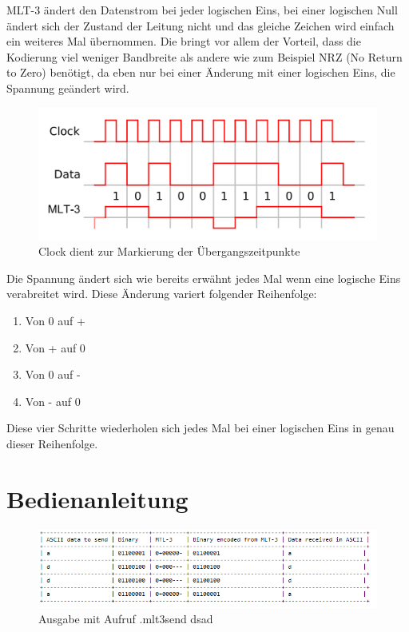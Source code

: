 \documentclass{article}
\begin{document}
MLT-3 ändert den Datenstrom bei jeder logischen Eins, bei einer logischen Null ändert sich der Zustand der Leitung nicht und das
gleiche Zeichen wird einfach ein weiteres Mal übernommen. Die bringt vor allem der Vorteil, dass die Kodierung viel weniger Bandbreite als
andere wie zum Beispiel NRZ (No Return to Zero) benötigt, da eben nur bei einer Änderung mit einer logischen Eins, die Spannung geändert wird.

\begin{center}
\begin{figure}[h]
    \centering
    \includegraphics[width=\textwidth]{MLT3encoding.png}
    \caption{Clock dient zur Markierung der Übergangszeitpunkte}
\end{figure}
\end{center}
\break

Die Spannung ändert sich wie bereits erwähnt jedes Mal wenn eine logische Eins verabreitet wird. Diese Änderung variert folgender
Reihenfolge:

\begin{enumerate}
	\item Von 0 auf +
	\item Von + auf 0
	\item Von 0 auf -
	\item Von - auf 0
\end{enumerate}

Diese vier Schritte wiederholen sich jedes Mal bei einer logischen Eins in genau dieser Reihenfolge.

\section{Bedienanleitung}

\begin{center}
\begin{figure}[h]
    \centering
    \includegraphics[width=16cm]{output2.png}
    \caption{Ausgabe mit Aufruf .mlt3send dsad}
\end{figure}
\end{center}
\end{document}
